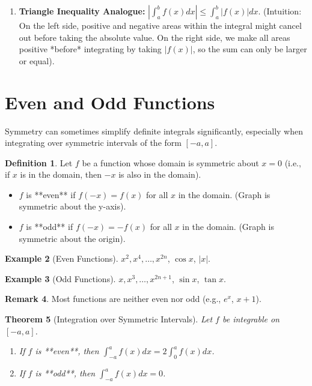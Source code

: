 \documentclass[11pt]{article}
\newtheorem{theorem}{Theorem}[section]
\theoremstyle{definition}
\newtheorem{definition}[theorem]{Definition}
\newtheorem{example}[theorem]{Example}
\newtheorem{remark}[theorem]{Remark}
\theoremstyle{remark} %
\begin{document}
\begin{enumerate}
    \item \textbf{Triangle Inequality Analogue:} $\displaystyle \left| \int_a^b f(x) dx \right| \le \int_a^b |f(x)| dx$.
        (Intuition: On the left side, positive and negative areas within the integral might cancel out before taking the absolute value. On the right side, we make all areas positive *before* integrating by taking $|f(x)|$, so the sum can only be larger or equal).
\end{enumerate}

\section{Even and Odd Functions}

Symmetry can sometimes simplify definite integrals significantly, especially when integrating over symmetric intervals of the form $[-a, a]$.

\begin{definition}
Let $f$ be a function whose domain is symmetric about $x=0$ (i.e., if $x$ is in the domain, then $-x$ is also in the domain).
\begin{itemize}
    \item $f$ is **even** if $f(-x) = f(x)$ for all $x$ in the domain. (Graph is symmetric about the y-axis).
    \item $f$ is **odd** if $f(-x) = -f(x)$ for all $x$ in the domain. (Graph is symmetric about the origin).
\end{itemize}
\end{definition}

\begin{example}[Even Functions]
$x^2, x^4, \dots, x^{2n}$, $\cos x$, $|x|$.
\end{example}

\begin{example}[Odd Functions]
$x, x^3, \dots, x^{2n+1}$, $\sin x$, $\tan x$.
\end{example}

\begin{remark}
Most functions are neither even nor odd (e.g., $e^x$, $x+1$).
\end{remark}

\begin{theorem}[Integration over Symmetric Intervals]
Let $f$ be integrable on $[-a, a]$.
\begin{enumerate}
    \item If $f$ is **even**, then $\displaystyle \int_{-a}^a f(x) dx = 2 \int_0^a f(x) dx$.
    \item If $f$ is **odd**, then $\displaystyle \int_{-a}^a f(x) dx = 0$.
\end{enumerate}
\end{theorem}
\end{document}
